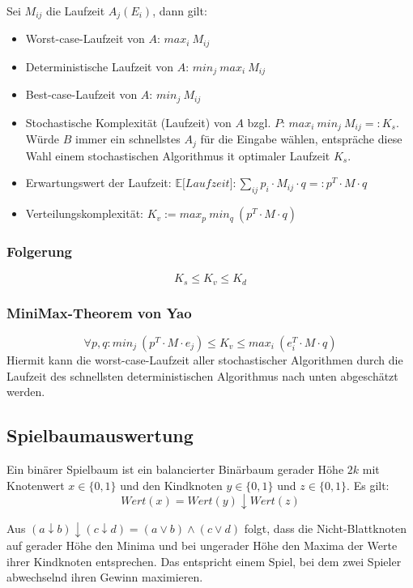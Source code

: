 Sei \(M_{ij}\) die Laufzeit \(A_j(E_i)\), dann gilt:

\begin{itemize}
	\item Worst-case-Laufzeit von \(A\): \(max_i~M_{ij}\)
	\item Deterministische Laufzeit von \(A\): \(min_j~max_i~M_{ij}\)
	\item Best-case-Laufzeit von \(A\): \(min_j~M_{ij}\)
	\item Stochastische Komplexität (Laufzeit) von \(A\) bzgl. \(P\): \(max_i~min_j~M_{ij} =: K_s\). Würde \(B\) immer ein schnellstes \(A_j\) für die Eingabe wählen, entspräche diese Wahl einem stochastischen Algorithmus it optimaler Laufzeit \(K_s\).
	\item Erwartungswert der Laufzeit: \(\mathbb{E}\lbrack Laufzeit \rbrack: \sum_{ij} p_i \cdot M_{ij} \cdot q =: p^T \cdot M \cdot q\)
	\item Verteilungskomplexität: \(K_v := max_p~min_q~(p^T \cdot M \cdot q)\)
\end{itemize}

\subsubsection{Folgerung}
\[K_s \leq K_v \leq K_d\]

\subsubsection{MiniMax-Theorem von Yao}
\[\forall p,q: min_j~(p^T \cdot M \cdot e_j) \leq K_v \leq max_i~(e_i^T \cdot M \cdot q)\]
Hiermit kann die worst-case-Laufzeit aller stochastischer Algorithmen durch die Laufzeit des schnellsten deterministischen Algorithmus nach unten abgeschätzt werden.


\subsection{Spielbaumauswertung}
Ein binärer Spielbaum ist ein balancierter Binärbaum gerader Höhe \(2k\) mit Knotenwert \(x \in \{0,1\}\) und den Kindknoten \(y \in \{0,1\}\) und \(z \in \{0,1\}\). Es gilt:
\[Wert(x) = Wert(y) \downarrow Wert(z)\]

Aus \((a \downarrow b) \downarrow (c \downarrow d) = (a \vee b) \wedge (c \vee d)\) folgt, dass die Nicht-Blattknoten auf gerader Höhe den Minima und bei ungerader Höhe den Maxima der Werte ihrer Kindknoten entsprechen. Das entspricht einem Spiel, bei dem zwei Spieler abwechselnd ihren Gewinn maximieren.

